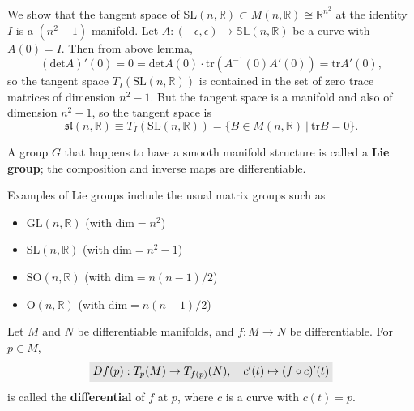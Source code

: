 \documentclass[letter-paper]{tufte-book}
\newenvironment{example}[1][Example]{\begin{trivlist}
\item[\hskip \labelsep {\bfseries #1}]}{\end{trivlist}}
\newcommand{\highlight}[1]{\mathchoice%
  {\colorbox{black!10}{$\displaystyle#1$}}%
  {\colorbox{black!10}{$\textstyle#1$}}%
  {\colorbox{black!10}{$\scriptstyle#1$}}%
  {\colorbox{black!10}{$\scriptscriptstyle#1$}}}%
\begin{document}
\begin{example}
  We show that the tangent space of $\mbox{SL}(n,\mathbb{R}) \subset M(n, \mathbb{R}) \cong \mathbb{R}^{n^2}$ at the identity $I$ is a $(n^2-1)$-manifold. Let $A:(-\epsilon, \epsilon) \to \mathbb{SL}(n,\mathbb{R})$ be a curve with $A(0) = I$. Then from above lemma,
  \begin{equation*}
    (\mbox{det} A)'(0) = 0 = \mbox{det}A(0)\cdot \mbox{tr}\left(A^{-1}(0)A'(0)\right) = \mbox{tr}A'(0),
  \end{equation*}
  so the tangent space $T_I(\mbox{SL}(n,\mathbb{R}))$ is contained in the set of zero trace matrices of dimension $n^2-1$. But the tangent space is a manifold and also of dimension $n^2-1$, so the tangent space is
  \begin{equation*}
    \mathfrak{sl}(n,\mathbb{R}) \equiv T_I(\mbox{SL}(n,\mathbb{R})) = \{B \in M(n,\mathbb{R})\ |\ \mbox{tr}B = 0\}.
  \end{equation*}
\end{example}

A group $G$ that happens to have a smooth manifold structure is called a \textbf{Lie group}; the composition and inverse maps are differentiable.

Examples of Lie groups include the usual matrix groups such as
\begin{itemize}
  \item $\mbox{GL}(n, \mathbb{R})$ (with $\mbox{dim}=n^2$)
  \item $\mbox{SL}(n, \mathbb{R})$ (with $\mbox{dim}=n^2 - 1$)
  \item $\mbox{SO}(n, \mathbb{R})$ (with $\mbox{dim}=n(n-1)/2$)
  \item $\mbox{O}(n, \mathbb{R})$ (with $\mbox{dim}=n(n-1)/2$)
\end{itemize}

Let $M$ and $N$ be differentiable manifolds, and $f: M \to N$ be differentiable. For $p \in M$,
\begin{equation}
  \highlight{Df(p): T_p(M) \to T_{f(p)}(N), \quad c'(t) \mapsto (f\circ c)'(t)}
\end{equation}
is called the \textbf{differential} of $f$ at $p$, where $c$ is a curve with $c(t) = p$. 
\end{document}
